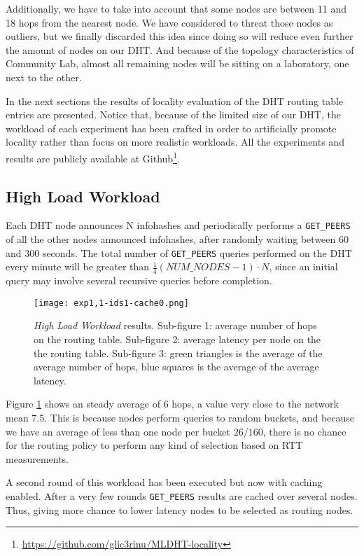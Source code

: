\documentclass[conference]{IEEEtran}
\begin{document}
Additionally, we have to take into account that some nodes are between 11 and 18 hops from the nearest node. We have considered to threat those nodes as outliers, but we finally discarded this idea since doing so will reduce even further the amount of nodes on our DHT. And because of the topology characteristics of Community Lab, almost all remaining nodes will be sitting on a laboratory, one next to the other.

In the next sections the results of locality evaluation of the DHT routing table entries are presented. Notice that, because of the limited size of our DHT, the workload of each experiment has been crafted in order to artificially promote locality rather than focus on more realistic workloads. All the experiments and results are publicly available at Github\footnote{\url{https://github.com/glic3rinu/MLDHT-locality}}.


\subsection{High Load Workload}

Each DHT node announces N infohashes and periodically performs a \texttt{GET\_PEERS} of all the other nodes announced infohashes, after randomly waiting between 60 and 300 seconds. The total number of \texttt{GET\_PEERS} queries performed on the DHT every minute will be greater than $\frac{1}{4} (NUM\_NODES-1) \cdot N$, since an initial query may involve several recursive queries before completion.

\begin{figure}
    \texttt{[image: exp1,1-ids1-cache0.png]}
    \caption{\textit{High Load Workload} results. Sub-figure 1: average number of hops on the routing table. Sub-figure 2: average latency per node on the the routing table. Sub-figure 3: green triangles is the average of the average number of hops, blue squares is the average of the average latency.}
    \label{fig:exp1,1-ids1-cache0}
\end{figure}

Figure \ref{fig:exp1,1-ids1-cache0} shows an steady average of 6 hops, a value very close to the network mean 7.5. This is because nodes perform queries to random buckets, and because we have an average of less than one node per bucket $26/160$, there is no chance for the routing policy to perform any kind of selection based on RTT measurements.

A second round of this workload has been executed but now with caching enabled. After a very few rounds \texttt{GET\_PEERS} results are cached over several nodes. Thus, giving more chance to lower latency nodes to be selected as routing nodes.
\end{document}
